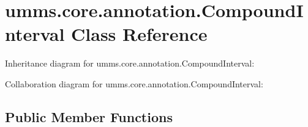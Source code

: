 \hypertarget{classumms_1_1core_1_1annotation_1_1_compound_interval}{\section{umms.\+core.\+annotation.\+Compound\+Interval Class Reference}
\label{classumms_1_1core_1_1annotation_1_1_compound_interval}
}


Inheritance diagram for umms.\+core.\+annotation.\+Compound\+Interval\+:


Collaboration diagram for umms.\+core.\+annotation.\+Compound\+Interval\+:
\subsection*{Public Member Functions}
